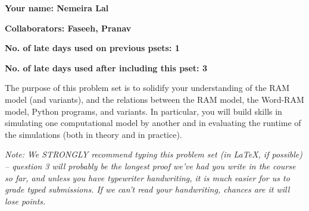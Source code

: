 \documentclass[11pt]{article}
\begin{document}

\textbf{Your name: Nemeira Lal}

\textbf{Collaborators: Faseeh, Pranav}

\textbf{No. of late days used on previous psets: 1}

\textbf{No. of late days used after including this pset: 3}


The purpose of this problem set is to solidify your understanding of the RAM model (and variants), and the relations between the RAM model, the Word-RAM model, Python programs, and variants. In particular, you will build skills in simulating one computational model by another and in evaluating the runtime of the simulations (both in theory and in practice).

\textit{Note: We STRONGLY recommend typing this problem set (in LaTeX, if possible) -- question 3 will probably be the longest proof we've had you write in the course so far, and unless you have typewriter handwriting, it is much easier for us to grade typed submissions. If we can't read your handwriting, chances are it will lose points.}
\end{document}
